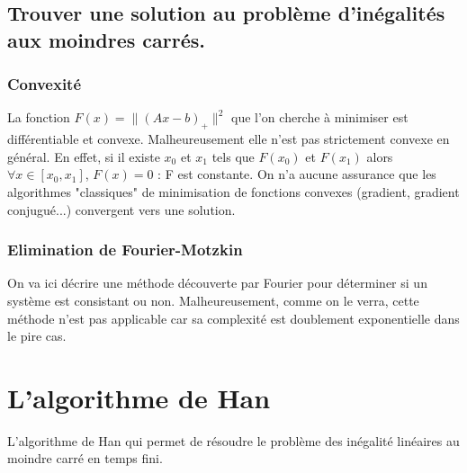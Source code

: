 \documentclass[10pt,a4paper]{article}
\begin{document}
\subsection{Trouver une solution au problème d'inégalités aux moindres carrés.}

\subsubsection{Convexité}
La fonction $F(x)=\|(Ax-b)_+ \|^2$ que l'on cherche à minimiser est différentiable et convexe.
Malheureusement elle n'est pas strictement convexe en général.
En effet, si il existe $x_0$ et $x_1$ tels que $F(x_0)$ et $F(x_1)$ alors $\forall x \in [x_0, x_1]$, $F(x) = 0$ : F est constante.
On n'a aucune assurance que les algorithmes "classiques" de minimisation de fonctions convexes (gradient, gradient conjugué...) convergent vers une solution.

\subsubsection{Elimination de Fourier-Motzkin}
On va ici décrire une méthode découverte par Fourier pour déterminer si un système est consistant ou non.
Malheureusement, comme on le verra, cette méthode n'est pas applicable car sa complexité est doublement exponentielle dans le pire cas.


\section{L'algorithme de Han}

L'algorithme de Han \cite{hanalgo} qui permet de résoudre le problème des inégalité linéaires au moindre carré en temps fini.
\end{document}
